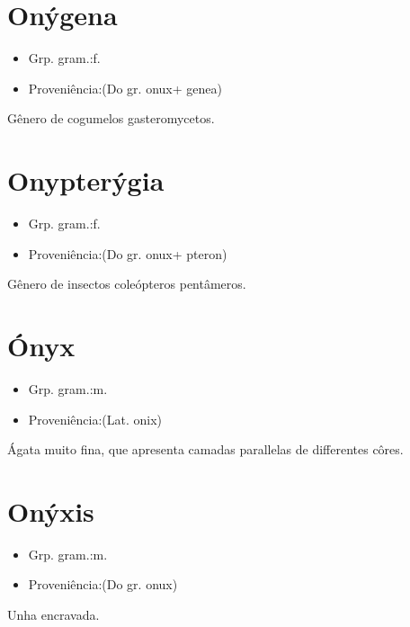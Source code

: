 \section{Onýgena}
\begin{itemize}
\item {Grp. gram.:f.}
\end{itemize}
\begin{itemize}
\item {Proveniência:(Do gr. \textunderscore onux\textunderscore  + \textunderscore genea\textunderscore )}
\end{itemize}
Gênero de cogumelos gasteromycetos.
\section{Onypterýgia}
\begin{itemize}
\item {Grp. gram.:f.}
\end{itemize}
\begin{itemize}
\item {Proveniência:(Do gr. \textunderscore onux\textunderscore  + \textunderscore pteron\textunderscore )}
\end{itemize}
Gênero de insectos coleópteros pentâmeros.
\section{Ónyx}
\begin{itemize}
\item {Grp. gram.:m.}
\end{itemize}
\begin{itemize}
\item {Proveniência:(Lat. \textunderscore onix\textunderscore )}
\end{itemize}
Ágata muito fina, que apresenta camadas parallelas de differentes côres.
\section{Onýxis}
\begin{itemize}
\item {Grp. gram.:m.}
\end{itemize}
\begin{itemize}
\item {Proveniência:(Do gr. \textunderscore onux\textunderscore )}
\end{itemize}
Unha encravada.

